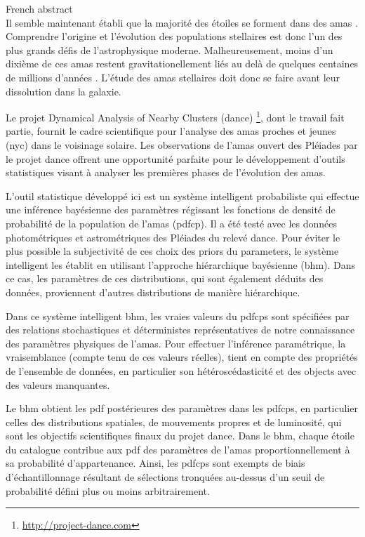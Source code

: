 {\LARGE French abstract}\\


Il semble maintenant établi que la majorité des étoiles se forment dans des amas \citep{2000AJ....120.3139C, 2003AJ....126.1916P,2003ARA&A..41...57L}. Comprendre l'origine et l'évolution des populations stellaires est donc l'un des plus grands défis de l'astrophysique moderne. Malheureusement, moins d'un dixième de ces amas restent gravitationellement liés au delà de quelques centaines de millions d'années \citep{2003ARA&A..41...57L}. L’étude des amas stellaires doit donc se faire avant leur dissolution dans la galaxie.

Le projet Dynamical Analysis of Nearby Clusters (\gls{dance}) \footnote{\url{http://project-dance.com}}, dont le travail fait partie, fournit le cadre scientifique pour l'analyse des amas proches et jeunes (\gls{nyc}) dans le voisinage solaire. Les observations de l'amas ouvert des Pléiades par le projet \gls{dance} offrent une opportunité parfaite pour le développement d'outils statistiques visant à analyser les premières phases de l'évolution des amas.

L'outil statistique développé ici est un système intelligent probabiliste qui effectue une inférence bayésienne des paramètres régissant les fonctions de densité de probabilité  de la population de l'amas (\gls{pdfcp}). Il a été testé avec les données photométriques et astrométriques des Pléiades du relevé \gls{dance}. Pour éviter le plus possible la subjectivité de ces choix des priors du parameters, le système intelligent les établit en utilisant l'approche hiérarchique bayésienne (\gls{bhm}). Dans ce cas, les paramètres de ces distributions, qui sont également déduits des données, proviennent d'autres distributions de manière hiérarchique.

Dans ce système intelligent \gls{bhm}, les vraies valeurs du \glspl{pdfcp} sont spécifiées par des relations stochastiques et déterministes représentatives de notre connaissance des paramètres physiques de l'amas. Pour effectuer l'inférence paramétrique, la vraisemblance (compte tenu de ces valeurs réelles), tient en compte des propriétés de l'ensemble de données, en particulier son hétéroscédasticité et des objects avec des valeurs manquantes.

Le \gls{bhm} obtient les \gls{pdf} postérieures des paramètres dans les \glspl{pdfcp}, en particulier celles des distributions spatiales, de mouvements propres et de luminosité, qui sont les objectifs scientifiques finaux du projet \gls{dance}. Dans le \gls{bhm}, chaque étoile du catalogue contribue aux \gls{pdf} des paramètres de l'amas proportionnellement à sa probabilité d'appartenance. Ainsi, les \glspl{pdfcp} sont exempts de biais d'échantillonnage résultant de sélections tronquées au-dessus d'un seuil de probabilité défini plus ou moins arbitrairement.

